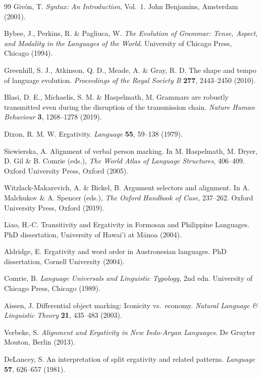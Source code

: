 \documentclass[12pt,a4paper]{article}
\begin{document}
\begin{thebibliography}{99}
Giv\'{o}n, T.
\textit{Syntax: An Introduction}, Vol.~1.
John Benjamins, Amsterdam (2001).

Bybee, J., Perkins, R. \& Pagliuca, W.
\textit{The Evolution of Grammar: Tense, Aspect, and Modality in the
Languages of the World}.
University of Chicago Press, Chicago (1994).

Greenhill, S. J., Atkinson, Q. D., Meade, A. \& Gray, R. D.
The shape and tempo of language evolution.
\textit{Proceedings of the Royal Society B} \textbf{277}, 2443--2450 (2010).

Blasi, D. E., Michaelis, S. M. \& Haspelmath, M.
Grammars are robustly transmitted even during the disruption of the
transmission chain.
\textit{Nature Human Behaviour} \textbf{3}, 1268--1278 (2019).

Dixon, R. M. W.
Ergativity.
\textit{Language} \textbf{55}, 59--138 (1979).

Siewierska, A.
Alignment of verbal person marking. In M. Haspelmath, M. Dryer, D. Gil \& B. Comrie (eds.),
\textit{The World Atlas of Language Structures}, 406--409. Oxford University Press, Oxford (2005).

Witzlack-Makarevich, A. \& Bickel, B.
Argument selectors and alignment. In A. Malchukov \& A. Spencer (eds.),
\textit{The Oxford Handbook of Case}, 237--262. Oxford University Press, Oxford (2019).

Liao, H.-C.
Transitivity and Ergativity in Formosan and Philippine Languages.
PhD dissertation, University of Hawai'i at M\={a}noa (2004).

Aldridge, E.
Ergativity and word order in Austronesian languages.
PhD dissertation, Cornell University (2004).

Comrie, B.
\textit{Language Universals and Linguistic Typology}, 2nd edn.
University of Chicago Press, Chicago (1989).

Aissen, J.
Differential object marking: Iconicity vs.\ economy.
\textit{Natural Language \& Linguistic Theory} \textbf{21}, 435--483 (2003).

Verbeke, S.
\textit{Alignment and Ergativity in New Indo-Aryan Languages}.
De Gruyter Mouton, Berlin (2013).

DeLancey, S.
An interpretation of split ergativity and related patterns.
\textit{Language} \textbf{57}, 626--657 (1981).


\end{thebibliography}
\end{document}
